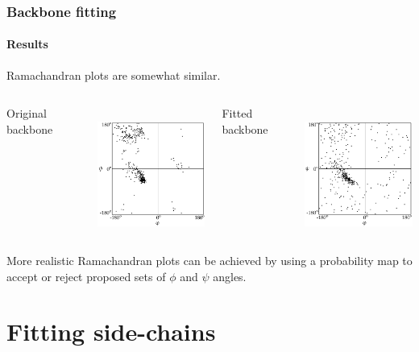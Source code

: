 \documentclass{beamer}
\begin{document}
\begin{frame}[t, fragile]
\frametitle{Backbone fitting} 
\framesubtitle{Results}

Ramachandran plots are somewhat similar.

\vspace*{2mm}
\begin{columns}[c]
\column{1.7in}
\centering
\begin{small}Original backbone\end{small}
\\
\hspace*{-.33cm}\includegraphics[width=1.7in]{plot_ramachandran_orig}

\column{1.7in}
\centering
\begin{small}Fitted backbone\end{small}
\\
\hspace*{-.4cm}\includegraphics[width=1.7in]{plot_ramachandran}
\end{columns}
\vspace*{2mm}

More realistic Ramachandran plots can be achieved by using a probability map to accept or reject proposed sets of $\phi$ and $\psi$ angles.

\end{frame}




\section{Fitting side-chains}
\end{document}
